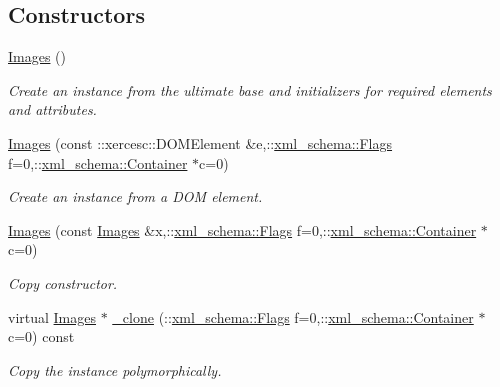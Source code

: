 \subsection*{Constructors}
\begin{DoxyCompactItemize}
\item 
\hypertarget{classopenstack_1_1xml_1_1Images_a0d6fc822c9378ee441e92020bfc20a26}{
\hyperlink{classopenstack_1_1xml_1_1Images_a0d6fc822c9378ee441e92020bfc20a26}{Images} ()}
\label{classopenstack_1_1xml_1_1Images_a0d6fc822c9378ee441e92020bfc20a26}

\begin{DoxyCompactList}\small\item\em Create an instance from the ultimate base and initializers for required elements and attributes. \item\end{DoxyCompactList}\item 
\hyperlink{classopenstack_1_1xml_1_1Images_adc99d1363fc5b0e207f3a235abc3a0da}{Images} (const ::xercesc::DOMElement \&e,::\hyperlink{namespacexml__schema_affb4c227cbd9aa7453dd1dc5a1401943}{xml\_\-schema::Flags} f=0,::\hyperlink{namespacexml__schema_a333dea2213742aea47a37532dec4ec27}{xml\_\-schema::Container} $\ast$c=0)
\begin{DoxyCompactList}\small\item\em Create an instance from a DOM element. \item\end{DoxyCompactList}\item 
\hyperlink{classopenstack_1_1xml_1_1Images_ae2494ae03ce10bd451235b1746e84426}{Images} (const \hyperlink{classopenstack_1_1xml_1_1Images}{Images} \&x,::\hyperlink{namespacexml__schema_affb4c227cbd9aa7453dd1dc5a1401943}{xml\_\-schema::Flags} f=0,::\hyperlink{namespacexml__schema_a333dea2213742aea47a37532dec4ec27}{xml\_\-schema::Container} $\ast$c=0)
\begin{DoxyCompactList}\small\item\em Copy constructor. \item\end{DoxyCompactList}\item 
virtual \hyperlink{classopenstack_1_1xml_1_1Images}{Images} $\ast$ \hyperlink{classopenstack_1_1xml_1_1Images_a39bc138dadd8acd71fc1a983543b6fd9}{\_\-clone} (::\hyperlink{namespacexml__schema_affb4c227cbd9aa7453dd1dc5a1401943}{xml\_\-schema::Flags} f=0,::\hyperlink{namespacexml__schema_a333dea2213742aea47a37532dec4ec27}{xml\_\-schema::Container} $\ast$c=0) const 
\begin{DoxyCompactList}\small\item\em Copy the instance polymorphically. \item\end{DoxyCompactList}\end{DoxyCompactItemize}


